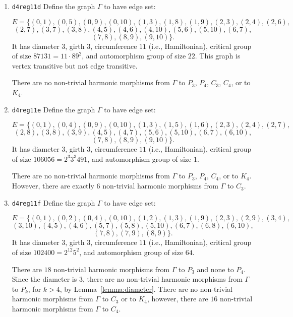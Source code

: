 \documentclass[12pt,letterpaper]{article}
\theoremstyle{definition}
\begin{document}
\begin{enumerate}
\item
 {\tt d4reg11d}\newline
  Define the graph  $\Gamma$
  to have edge set:

\[
E = \{
(0, 1), (0, 5), (0, 9), (0, 10), (1, 3), (1, 8), (1, 9), (2, 3), (2, 4), (2, 6),
\]
\[
(2, 7), (3, 7),  (3, 8), (4, 5), (4, 6), (4, 10), (5, 6), (5, 10), (6, 7),
\]
\[
(7, 8), (8, 9), (9, 10)
\}.
\]
It has diameter $3$,
girth $3$, circumference $11$ (i.e., Hamiltonian),
critical group of size $87131 = 11\cdot 89^2$, 
and automorphism group of size $22$. This graph is vertex transitive but not
edge transitive.

There are no non-trivial harmonic morphisms from $\Gamma$ to $P_3$, $P_4$, $C_3$, $C_4$, or to $K_4$.


\item
 {\tt d4reg11e}\newline
  Define the graph  $\Gamma$
  to have edge set:

\[
E = \{
(0, 1), (0, 4), (0, 9), (0, 10), (1, 3), (1, 5), (1, 6), (2, 3), (2, 4), (2, 7),
\]
\[
(2, 8), (3, 8), (3, 9), (4, 5), (4, 7), (5, 6), (5, 10), (6, 7), (6, 10),
\]
\[
(7, 8), (8, 9), (9, 10)
\}.
\]
It has diameter $3$,
girth $3$, circumference $11$ (i.e., Hamiltonian),
critical group of size $106056 = 2^3 3^3 491$, 
and automorphism group of size $1$. 

There are no non-trivial harmonic morphisms from $\Gamma$ to $P_3$, $P_4$, $C_4$, or to $K_4$.
However, there are exactly $6$ non-trivial harmonic morphisms from $\Gamma$ to $C_3$. 


\item
 {\tt d4reg11f}\newline
  Define the graph  $\Gamma$
  to have edge set:

\[
E = \{
(0, 1), (0, 2), (0, 4), (0, 10), (1, 2), (1, 3), (1, 9), (2, 3), (2, 9), (3, 4), 
\]
\[
(3, 10), (4, 5), (4, 6), (5, 7), (5, 8), (5, 10), (6, 7), (6, 8), (6, 10),
\]
\[
 (7, 8), (7, 9), (8, 9)
\}.
\]
It has diameter $3$,
girth $3$, circumference $11$ (i.e., Hamiltonian),
critical group of size $102400=2^{12} 5^2$, 
and automorphism group of size $64$. 

There are $18$ non-trivial harmonic morphisms from $\Gamma$ to $P_3$ and
none to $P_4$.
Since the diameter is $3$, there are no non-trivial harmonic morphisms
from $\Gamma$ to $P_k$, for $k>4$, by Lemma~\ref{lemma:diameter}.
There are no non-trivial harmonic morphisms from $\Gamma$ to $C_3$ or
to $K_4$, however, there are $16$ non-trivial harmonic morphisms
from $\Gamma$ to $C_4$.



\end{enumerate}
\end{document}
